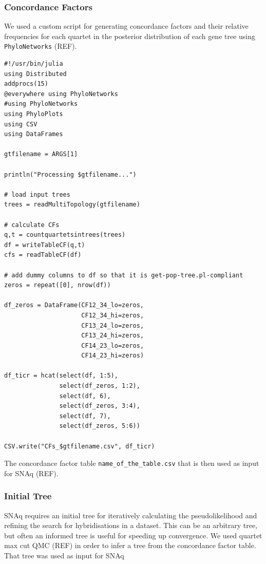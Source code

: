 \documentclass[utf8]{frontiers_suppmat} %
\begin{document}
\subsubsection{Concordance Factors}

We used a custom script for generating concordance factors and their relative frequencies for each quartet in the posterior distribution of each gene tree using \texttt{PhyloNetworks} (REF).

\begin{verbatim}
#!/usr/bin/julia
using Distributed
addprocs(15)
@everywhere using PhyloNetworks
#using PhyloNetworks
using PhyloPlots
using CSV
using DataFrames

gtfilename = ARGS[1]

println("Processing $gtfilename...")

# load input trees
trees = readMultiTopology(gtfilename)

# calculate CFs
q,t = countquartetsintrees(trees)
df = writeTableCF(q,t)
cfs = readTableCF(df)

# add dummy columns to df so that it is get-pop-tree.pl-compliant
zeros = repeat([0], nrow(df))

df_zeros = DataFrame(CF12_34_lo=zeros,
                     CF12_34_hi=zeros,
                     CF13_24_lo=zeros,
                     CF13_24_hi=zeros,
                     CF14_23_lo=zeros,
                     CF14_23_hi=zeros)

df_ticr = hcat(select(df, 1:5),
               select(df_zeros, 1:2),
               select(df, 6),
               select(df_zeros, 3:4),
               select(df, 7),
               select(df_zeros, 5:6))

CSV.write("CFs_$gtfilename.csv", df_ticr)
\end{verbatim}

The concordance factor table \texttt{name_of_the_table.csv} that is then used as input for SNAq (REF).

\subsubsection{Initial Tree}

SNAq requires an initial tree for iteratively calculating the pseudolikelihood and refining the search for hybridisations in a dataset. This can be an arbitrary tree, but often an informed tree is useful for speeding up convergence. We used quartet max cut QMC (REF) in order to infer a tree from the concordance factor table. That tree was used as input for SNAq
\end{document}
